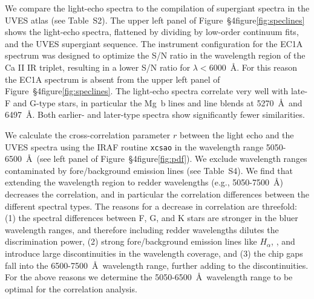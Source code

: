 We compare the light-echo spectra to the compilation of supergiant
spectra in the UVES atlas\cite{Bagnulo03} (see Table~S2).
\ifcheck
\fi
The upper left panel of Figure~\S4figure\ref{fig:speclines} shows the
light-echo spectra, flattened by dividing by low-order continuum fits,
and the UVES supergiant sequence.  The instrument configuration for
the EC1A spectrum was designed to optimize the S/N ratio in the
wavelength region of the Ca II IR triplet, resulting in a lower S/N
ratio for $\lambda<6000$~\AA. For this reason the EC1A spectrum is
absent from the upper left panel of Figure~\S4figure\ref{fig:speclines}.  The
light-echo spectra correlate very well with late-F and G-type stars,
in particular the Mg~b lines and line blends at 5270~\AA\ and
6497~\AA. Both earlier- and later-type spectra show significantly
fewer similarities.

We calculate the cross-correlation parameter $r$ between the light
echo and the UVES spectra using the IRAF routine {\tt xcsao} in the
wavelength range 5050-6500~\AA\ (see left panel of
Figure~\S4figure\ref{fig:pdf}). We exclude wavelength ranges contaminated by
fore/background emission lines
(see Table~S4). 
\ifcheck
\fi
We find that extending the wavelength region to redder wavelengths
(e.g., 5050-7500~\AA) decreases the correlation, and in particular the
correlation differences between the different spectral types. The
reasons for a decrease in correlation are threefold: (1) the spectral
differences between F, G, and K stars are stronger in the bluer
wavelength ranges, and therefore including redder wavelengths dilutes
the discrimination power, (2) strong fore/background emission lines like
$H_{\alpha}$, , and  introduce large
discontinuities in the wavelength coverage, and (3) the chip gaps fall
into the 6500-7500~\AA\ wavelength range, further adding to the
discontinuities. For the above reasons we determine the 5050-6500~\AA\
wavelength range to be optimal for the correlation analysis.




